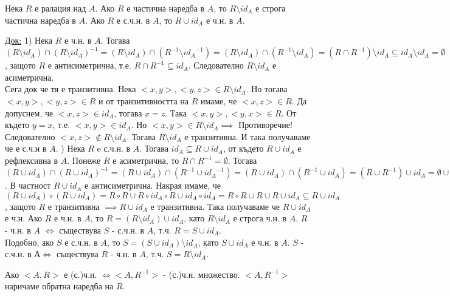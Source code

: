 \documentclass[fleqn, titlepage, 12pt]{report}
\begin{document}
 Нека $R$ е ралация над $A$. Ако $R$ е частична наредба в $A$, то $R \setminus id_A$ е строга частична наредба
в $A$. Ако $R$ е с.ч.н. в $A$, то $R \cup id_A$ е ч.н. в $A$.
\bigbreak

\underline{Док:} 1) Нека $R$ е ч.н. в $A$.
Тогава $(R \setminus id_A) \cap (R \setminus id_A)^{-1} = (R \setminus id_A) \cap (R^{-1} \setminus {id_A}^{-1})
= (R \setminus id_A) \cap (R^{-1} \setminus id_A) = (R \cap R^{-1}) \setminus id_A \subseteq id_A \setminus id_A
= \emptyset$, защото $R$ е антисиметрична, т.е. $R \cap R^{-1} \subseteq id_A$.
Следователно $R \setminus id_A$ е асиметрична.\\
Сега док че тя е транзитивна. Нека $<x,y>, <y,z> \in R \setminus id_A$. Но тогава $<x,y>, <y,z> \in R$ и от
транзитивността на $R$ имаме, че $<x,z> \in R$. Да допуснем, че $<x,z> \in id_A$, тогава $x = z$.
Така $<x,y>, <y,x> \in R$. От където $y = x$, т.е. $<x,y> \in id_A$.
Но $<x,y> \in R \setminus id_A \implies$ Противоречие! Следователно $<x,z> \notin R \setminus id_A$.
Тогава $R \setminus id_A$ е транзитивна. И така получаваме че е с.ч.н в $A$.
) Нека $R$ e с.ч.н. в $A$. Тогава $id_A \subseteq R \cup id_A$, от където $R \cup id_A$ е рефлексивна в $A$.
Понеже $R$ е асиметрична, то $R \cap R^{-1} = \emptyset$.
Тогава $(R \cup id_A) \cap (R \cup id_A)^{-1} = (R \cup id_A) \cap (R^{-1} \cup {id_A}^{-1})
= (R \cup id_A) \cap (R^{-1} \cup id_A) = (R \cup R^{-1}) \cup id_A = \emptyset \cup id_A = id_A$.
В частност $R \cup id_A$ е антисиметрична. Накрая имаме,
че $(R \cup id_A) \circ (R \cup id_A) = R \circ R \cup R \circ id_A \circ R \cup id_A \circ id_A
= R \circ R \cup R \cup R \cup id_A \subseteq R \cup id_A$,
защото $R$ е транзитивна $\implies R \cup id_A$ е транзитивна. Така получаваме че $R \cup id_A$ е ч.н.
\bigbreak
Ако $R$ е ч.н. в $A$, то $R = (R \setminus id_A) \cup id_A$, като $R \setminus id_A$ е строга ч.н. в $A$.
$R$ - ч.н. в $A$ $\Longleftrightarrow $ съществува $S$ - с.ч.н. в $A$, т.ч. $R = S \cup id_A$.\\
Подобно, ако $S$ е с.ч.н. в $A$, то $S = (S \cup id_A) \setminus id_A$, като $S \cup id_A$ е ч.н. в $A$.
$S$ - с.ч.н. в $А \Longleftrightarrow $  съществува $R$ - ч.н. в $A$, т.ч. $S = R \setminus id_A$.
\bigbreak

 Ако $<A,R>$ е (с.)ч.н. $\Longleftrightarrow <A,R^{-1}>$ - (с.)ч.н. множество.
$<A,R^{-1}>$ наричаме обратна наредба на $R$.
\bigbreak
\end{document}
